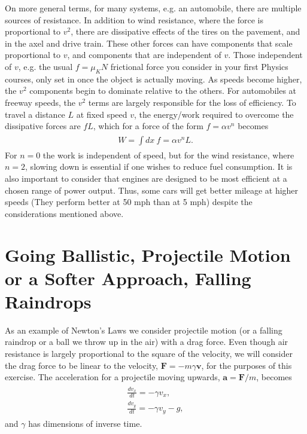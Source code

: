 \documentclass[letterpaper,10pt,english]{sphinxmanual}
\begin{document}
On more general terms,
for many systems, e.g. an automobile, there are multiple sources of
resistance. In addition to wind resistance, where the force is
proportional to \(v^2\), there are dissipative effects of the tires on
the pavement, and in the axel and drive train. These other forces can
have components that scale proportional to \(v\), and components that
are independent of \(v\). Those independent of \(v\), e.g. the usual
\(f=\mu_K N\) frictional force you consider in your first Physics courses, only set in
once the object is actually moving. As speeds become higher, the \(v^2\)
components begin to dominate relative to the others. For automobiles
at freeway speeds, the \(v^2\) terms are largely responsible for the
loss of efficiency. To travel a distance \(L\) at fixed speed \(v\), the
energy/work required to overcome the dissipative forces are \(fL\),
which for a force of the form \(f=\alpha v^n\) becomes
\begin{equation*}
\begin{split}
\begin{eqnarray}
W=\int dx~f=\alpha v^n L.
\end{eqnarray}
\end{split}
\end{equation*}
For \(n=0\) the work is
independent of speed, but for the wind resistance, where \(n=2\),
slowing down is essential if one wishes to reduce fuel consumption. It
is also important to consider that engines are designed to be most
efficient at a chosen range of power output. Thus, some cars will get
better mileage at higher speeds (They perform better at 50 mph than at
5 mph) despite the considerations mentioned above.


\section{Going Ballistic, Projectile Motion or a Softer Approach, Falling Raindrops}
\label{\detokenize{chapter1:going-ballistic-projectile-motion-or-a-softer-approach-falling-raindrops}}
As an example of Newton’s Laws we consider projectile motion (or a
falling raindrop or a ball we throw up in the air) with a drag force. Even though air resistance is
largely proportional to the square of the velocity, we will consider
the drag force to be linear to the velocity, \(\boldsymbol{F}=-m\gamma\boldsymbol{v}\),
for the purposes of this exercise. The acceleration for a projectile moving upwards,
\(\boldsymbol{a}=\boldsymbol{F}/m\), becomes
\begin{equation*}
\begin{split}
\begin{eqnarray}
\frac{dv_x}{dt}=-\gamma v_x,\\
\nonumber
\frac{dv_y}{dt}=-\gamma v_y-g,
\end{eqnarray}
\end{split}
\end{equation*}
and \(\gamma\) has dimensions of inverse time.
\end{document}
